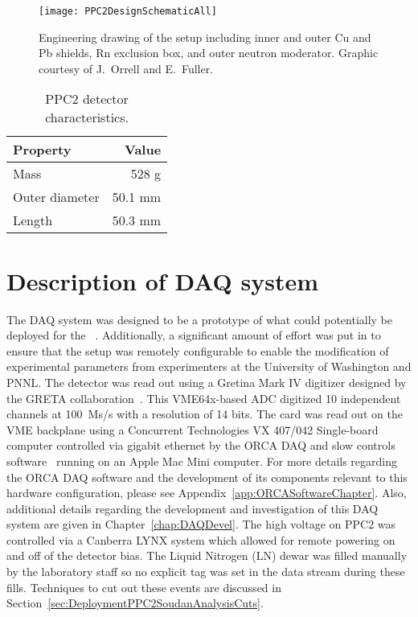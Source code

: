 			\begin{figure}
				\centering
				\texttt{[image: PPC2DesignSchematicAll]}
				\caption[Engineering drawing of PPC2 deployment, detailing outer components]
				{Engineering drawing of the setup including inner and outer Cu and Pb shields, Rn exclusion box, 
				and outer neutron moderator.  Graphic courtesy of J.~Orrell and E.~Fuller.}
				\label{fig:PPC2Shield}
			\end{figure}
	
			\begin{table}
				\centering
				\begin{tabular}{l|r}
					Property & Value \\
					\hline
					\hline
					Mass & 528 g \\
					Outer diameter & 50.1 mm \\
					Length & 50.3 mm \\
					\hline
					\hline
				\end{tabular}
				\caption[PPC2 detector characteristics]
				{PPC2 detector characteristics.  }
				\label{tab:PPC2Characteristics}
			\end{table}
	
	\section{Description of DAQ system}
	\label{sec:DeploymentPPC2SoudanDAQSystem}
	
	The DAQ system was designed to be a prototype of what could potentially be deployed for the \MJ~\minmod.  Additionally, a significant amount of effort was put in to ensure that the setup was remotely configurable to enable the modification of experimental parameters from experimenters at the University of Washington and PNNL.  The detector was read out using a Gretina Mark IV digitizer designed by the GRETA collaboration~\cite{Anderson:2009p1293}.  This VME64x-based ADC digitized 10 independent channels at 100~Ms/s with a resolution of 14 bits.  The card was read out on the VME backplane using a Concurrent Technologies VX 407/042 Single-board computer controlled via gigabit ethernet by the ORCA DAQ and slow controls software~\cite{ORCA} running on an Apple Mac Mini computer.  For more details regarding the ORCA DAQ software and the development of its components relevant to this hardware configuration, please see Appendix~\ref{app:ORCASoftwareChapter}.  Also, additional details regarding the development and investigation of this DAQ system are given in Chapter~\ref{chap:DAQDevel}. The high voltage on PPC2 was controlled via a Canberra LYNX system which allowed for remote powering on and off of the detector bias.  The Liquid Nitrogen (LN) dewar was filled manually by the laboratory staff so no explicit tag was set in the data stream during these fills.  Techniques to cut out these events are discussed in Section~\ref{sec:DeploymentPPC2SoudanAnalysisCuts}.
	    
